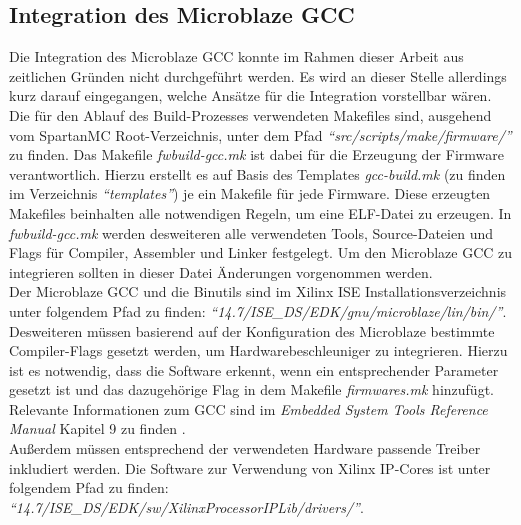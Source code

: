 \subsection{Integration des Microblaze GCC}
Die Integration des Microblaze GCC konnte im Rahmen dieser Arbeit aus zeitlichen Gründen nicht durchgeführt werden. Es wird an dieser Stelle allerdings kurz darauf eingegangen, welche Ansätze für die Integration vorstellbar wären.\\
Die für den Ablauf des Build-Prozesses verwendeten Makefiles sind, ausgehend vom SpartanMC Root-Verzeichnis, unter dem Pfad \textit{``src/scripts/make/firmware/''} zu finden. Das Makefile \textit{fwbuild-gcc.mk} ist dabei für die Erzeugung der Firmware verantwortlich. Hierzu erstellt es auf Basis des Templates \textit{gcc-build.mk} (zu finden im Verzeichnis \textit{``templates''}) je ein Makefile für jede Firmware. Diese erzeugten Makefiles beinhalten alle notwendigen Regeln, um eine ELF-Datei zu erzeugen. In \textit{fwbuild-gcc.mk} werden desweiteren alle verwendeten Tools, Source-Dateien und Flags für Compiler, Assembler und Linker festgelegt. Um den Microblaze GCC zu integrieren sollten in dieser Datei Änderungen vorgenommen werden.\\
Der Microblaze GCC und die Binutils sind im Xilinx ISE Installationsverzeichnis unter folgendem Pfad zu finden: \textit{``14.7/ISE\_DS/EDK/gnu/microblaze/lin/bin/''}. Desweiteren müssen basierend auf der Konfiguration des Microblaze bestimmte Compiler-Flags gesetzt werden, um Hardwarebeschleuniger zu integrieren. Hierzu ist es notwendig, dass die Software erkennt, wenn ein entsprechender Parameter gesetzt ist und das dazugehörige Flag in dem Makefile \textit{firmwares.mk} hinzufügt. Relevante Informationen zum GCC sind im \textit{Embedded System Tools Reference Manual} Kapitel 9 zu finden \cite{MGNU}.\\
Außerdem müssen entsprechend der verwendeten Hardware passende Treiber inkludiert werden. Die Software zur Verwendung von Xilinx IP-Cores ist unter folgendem Pfad zu finden: \textit{``14.7/ISE\_DS/EDK/sw/XilinxProcessorIPLib/drivers/''}.